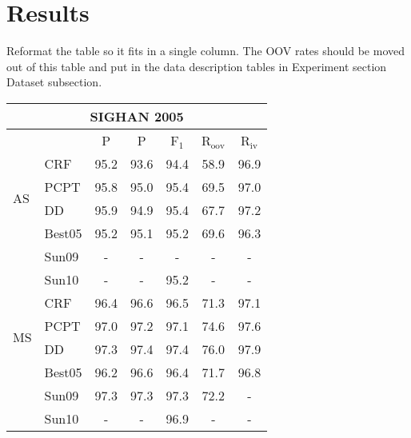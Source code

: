 \section{Results}

Reformat the table so it fits in a single column. 
The OOV rates should be moved out of this table and put in the data description tables in Experiment section Dataset subsection.

\begin{table}
\centering
\begin{small}
\begin{tabular}{ l | l | c | c | c | c | c   }
\multicolumn{7}{c}{\large{SIGHAN 2005}} \\
\hline
    \multicolumn{2}{c}{}  &  \multicolumn{1}{c}{P} &  \multicolumn{1}{c}{P}  & \multicolumn{1}{c}{F$_1$}   &   \multicolumn{1}{c|}{R$_{\mathrm{oov}}$}    &  \multicolumn{1}{c}{R$_{\mathrm{iv}}$}   \\ 
\hline
\multirow{4}{*}{AS} &  CRF                                                        & 95.2 &   93.6 & 94.4  &  58.9 & 96.9 \\
 & PCPT                                       & 95.8 & 95.0 & 95.4  & 69.5 & 97.0 \\ 
& DD                                       & 95.9 & 94.9 & {95.4}  & {67.7} & {97.2} \\
& Best05      & 95.2 &  {95.1} & 95.2 &   69.6 &  96.3 \\
& Sun09      &  -   & -  & -  &  -  & - \\
& Sun10      & -   & -  & 95.2  &   -  & - \\

\hline

\multirow{4}{*}{MS} &  CRF        &  96.4 &   96.6 &  96.5  & 71.3 & 97.1 \\
& PCPT &  97.0 &  97.2 &  97.1  & 74.6 & 97.6 \\
& DD & {97.3} &  {97.4} &  {97.4}  & {76.0} & {97.9} \\
& Best05      & 96.2  & 96.6 &  96.4  &   71.7 &   96.8 \\
& Sun09      & 97.3   & 97.3  & 97.3  &   72.2  & - \\
& Sun10      & -   & -  & 96.9  &   -  & - \\
\hline


\end{tabular}
\end{small}
\end{table}
